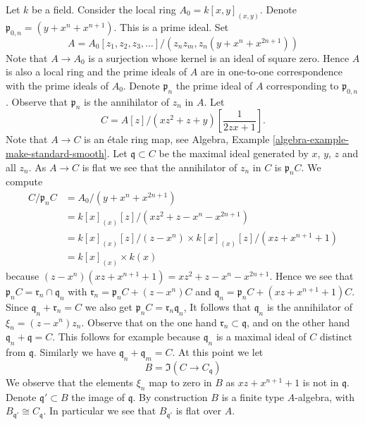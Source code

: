 \noindent
Let $k$ be a field. Consider the local ring $A_0 = k[x, y]_{(x, y)}$.
Denote $\mathfrak p_{0, n} = (y + x^n + x^{n + 1})$. This is a prime ideal.
Set
$$
A = A_0[z_1, z_2, z_3, \ldots]/(z_n z_m, z_n(y + x^n + x^{2n + 1}))
$$
Note that $A \to A_0$ is a surjection whose kernel is an ideal of
square zero. Hence $A$ is also a local ring and the prime ideals of $A$
are in one-to-one correspondence with the prime ideals of $A_0$.
Denote $\mathfrak p_n$ the prime ideal of $A$ corresponding to
$\mathfrak p_{0, n}$. Observe that $\mathfrak p_n$ is the annihilator
of $z_n$ in $A$. Let
$$
C = A[z]/(xz^2 + z + y)[\frac{1}{2zx + 1}].
$$
Note that $A \to C$ is an \'etale ring map, see
Algebra, Example \ref{algebra-example-make-standard-smooth}.
Let $\mathfrak q \subset C$ be the maximal ideal generated by
$x$, $y$, $z$ and all $z_n$. As $A \to C$ is flat we see that the
annihilator of $z_n$ in $C$ is $\mathfrak p_nC$. We compute
\begin{align*}
C/\mathfrak p_n C
& =
A_0/(y + x^n + x^{2n + 1}) \\
& =
k[x]_{(x)}[z]/(xz^2 + z - x^n - x^{2n + 1}) \\
& =
k[x]_{(x)}[z]/(z - x^n) \times k[x]_{(x)}[z]/(xz + x^{n + 1} + 1) \\
& =
k[x]_{(x)} \times k(x)
\end{align*}
because $(z - x^n)(xz + x^{n + 1} + 1) = xz^2 + z - x^n - x^{2n + 1}$.
Hence we see that $\mathfrak p_nC = \mathfrak r_n \cap \mathfrak q_n$
with $\mathfrak r_n = \mathfrak p_nC + (z - x^n)C$ and
$\mathfrak q_n = \mathfrak p_nC + (xz + x^{n + 1} + 1)C$.
Since $\mathfrak q_n + \mathfrak r_n = C$ we also get
$\mathfrak p_nC = \mathfrak r_n \mathfrak q_n$,
It follows that $\mathfrak q_n$ is the annihilator of $\xi_n = (z - x^n)z_n$.
Observe that on the one hand $\mathfrak r_n \subset \mathfrak q$, and
on the other hand $\mathfrak q_n + \mathfrak q = C$. This follows for example
because $\mathfrak q_n$ is a maximal ideal of $C$ distinct from $\mathfrak q$.
Similarly we have $\mathfrak q_n + \mathfrak q_m = C$.
At this point we let
$$
B = \Im(C \longrightarrow C_{\mathfrak q})
$$
We observe that the elements $\xi_n$ map to zero in $B$ as $xz + x^{n + 1} + 1$
is not in $\mathfrak q$. Denote $\mathfrak q' \subset B$ the image of
$\mathfrak q$. By construction $B$ is a finite type $A$-algebra, with
$B_{\mathfrak q'} \cong C_{\mathfrak q}$. In particular we see that
$B_{\mathfrak q'}$ is flat over $A$.

